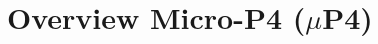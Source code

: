 \documentclass{hotnets19}
\begin{document}







\section{Overview Micro-P4 \;($\mu$P4)}
\label{section:overview-micro-p4}
\end{document}
